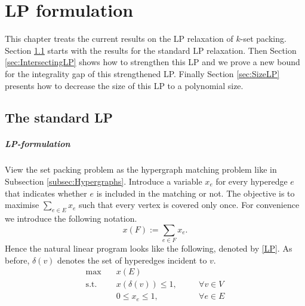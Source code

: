 \chapter{LP formulation}\label{chap:LP}

This chapter treats the current results on the LP relaxation of $k$-set packing. Section \ref{sec:StandardLP} starts with the results for the standard LP relaxation. Then Section \ref{sec:IntersectingLP} shows how to strengthen this LP and we prove a new bound for the integrality gap of this strengthened LP. Finally Section \ref{sec:SizeLP} presents how to decrease the size of this LP to a polynomial size. %

\section{The standard LP}\label{sec:StandardLP}

\paragraph{LP-formulation} View the set packing problem as the hypergraph matching problem like in Subsection \ref{subsec:Hypergraphs}. Introduce a variable $x_e$ for every hyperedge $e$ that indicates whether $e$ is included in the matching or not. The objective is to maximise $\displaystyle \sum_{e \in E} x_e$ such that every vertex is covered only once. For convenience we introduce the following notation.
%
\begin{equation*}
x(F) := \sum_{e \in F} x_e.
\end{equation*}
%
Hence the natural linear program looks like the following, denoted by \eqref{LP}. As before, $\delta(v)$ denotes the set of hyperedges incident to $v$.
%
\begin{equation}\tag{LP}\label{LP}
\begin{alignedat}{2}
\text{max}  \quad & x(E) \ \\
\text{s.t.} \quad & x\left(\delta(v)\right) \leq 1, & \quad & \forall v \in V \\
                  & 0 \leq x_e \leq 1,              & \quad & \forall e \in E
\end{alignedat}
\end{equation}

